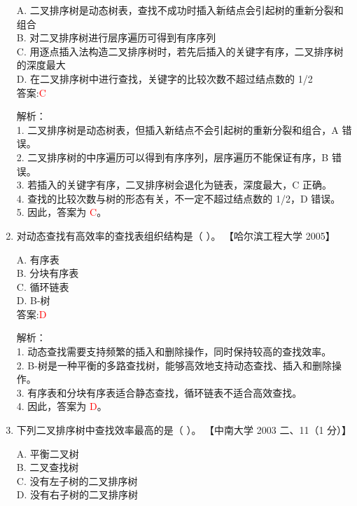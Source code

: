 \documentclass[lang=cn,newtx,10pt,scheme=chinese]{../../../elegantbook}
\begin{document}
\begin{enumerate}
    A. 二叉排序树是动态树表，查找不成功时插入新结点会引起树的重新分裂和组合 \\  
    B. 对二叉排序树进行层序遍历可得到有序序列 \\  
    C. 用逐点插入法构造二叉排序树时，若先后插入的关键字有序，二叉排序树的深度最大 \\  
    D. 在二叉排序树中进行查找，关键字的比较次数不超过结点数的 1/2 \\  

    答案:\textcolor{red}{C}

    解析：\\
    1. 二叉排序树是动态树表，但插入新结点不会引起树的重新分裂和组合，A 错误。\\
    2. 二叉排序树的中序遍历可以得到有序序列，层序遍历不能保证有序，B 错误。\\
    3. 若插入的关键字有序，二叉排序树会退化为链表，深度最大，C 正确。\\
    4. 查找的比较次数与树的形态有关，不一定不超过结点数的 1/2，D 错误。\\
    5. 因此，答案为 \textcolor{red}{C}。\\

    \item 对动态查找有高效率的查找表组织结构是（ ）。  
    【哈尔滨工程大学 2005】  

    A. 有序表 \\  
    B. 分块有序表 \\  
    C. 循环链表 \\  
    D. B-树 \\  

    答案:\textcolor{red}{D}

    解析：\\
    1. 动态查找需要支持频繁的插入和删除操作，同时保持较高的查找效率。\\
    2. B-树是一种平衡的多路查找树，能够高效地支持动态查找、插入和删除操作。\\
    3. 有序表和分块有序表适合静态查找，循环链表不适合高效查找。\\
    4. 因此，答案为 \textcolor{red}{D}。\\

\item 下列二叉排序树中查找效率最高的是（ ）。  
    【中南大学 2003 二、11（1 分）】  

    A. 平衡二叉树 \\  
    B. 二叉查找树 \\  
    C. 没有左子树的二叉排序树 \\  
    D. 没有右子树的二叉排序树 \\  


\end{enumerate}
\end{document}
